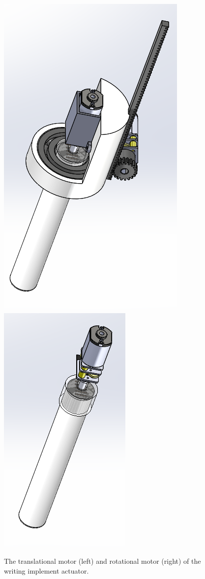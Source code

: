 \begin{figure}
 \centering
  	\includegraphics[width=0.48\columnwidth]{CAD-screen-shots/translational-motor.png}
  	\includegraphics[width=0.48\columnwidth]{CAD-screen-shots/rotational-motor.png}
	\caption{The translational motor (left) and rotational motor (right) of the writing implement actuator.}
 \label{fig:use-cases}
\end{figure}

